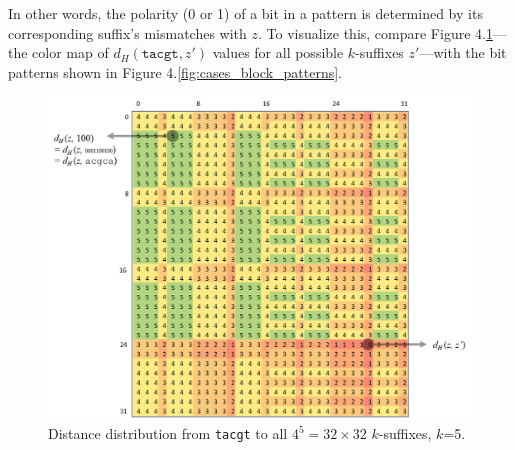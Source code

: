 \documentclass[oneside,12pt]{DISCSthesis}
\begin{document}
{		\noindent In other words, the polarity (0 or 1) of a bit in a pattern is determined by its corresponding suffix's mismatches with $z$. To visualize this, compare Figure 4.\ref{fig:D_tacgt}---the color map of $d_H(\texttt{tacgt},z')$ values for all possible $k$-suffixes $z'$---with the bit patterns shown in Figure 4.\ref{fig:cases_block_patterns}.
		\begin{figure}[h] \label{fig:D_tacgt}
			\centering
			\includegraphics[width=5.4in]{img/D(tacgt)-marked}
			\caption{Distance distribution from \texttt{tacgt} to all $4^{5} = 32 \times 32$ $k$-suffixes, $k$=5.}
			\end{figure}


}
\end{document}
